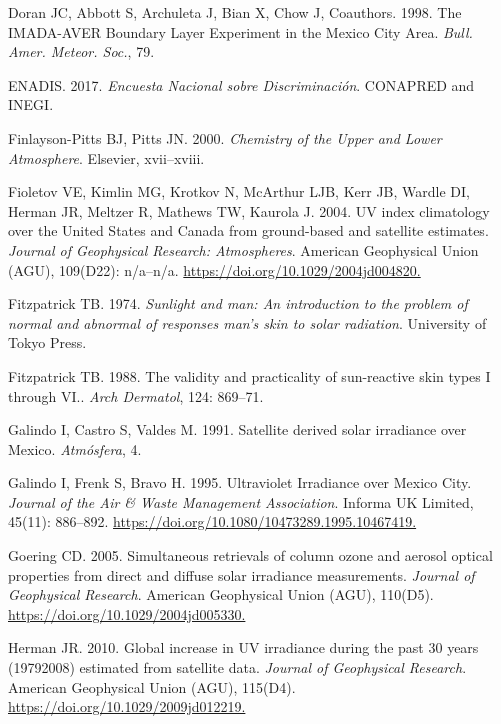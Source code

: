 \documentclass[10pt]{article}
\begin{document}
\label{csl:2}Doran JC, Abbott S, Archuleta J, Bian X, Chow J, Coauthors. 1998. {The IMADA-AVER Boundary Layer Experiment in the Mexico City Area}. \textit{Bull. Amer. Meteor. Soc.}, 79.

\label{csl:50}ENADIS. 2017. \textit{{Encuesta Nacional sobre Discriminación}}. CONAPRED and INEGI.

\label{csl:11}Finlayson-Pitts BJ, Pitts JN. 2000. \textit{{Chemistry of the Upper and Lower Atmosphere}}. Elsevier, xvii--xviii.

\label{csl:56}Fioletov VE, Kimlin MG, Krotkov N, McArthur LJB, Kerr JB, Wardle DI, Herman JR, Meltzer R, Mathews TW, Kaurola J. 2004. {{UV} index climatology over the United States and Canada from ground-based and satellite estimates}. \textit{Journal of Geophysical Research: Atmospheres}. American Geophysical Union ({AGU}), 109(D22): n/a--n/a. \url{https://doi.org/10.1029/2004jd004820.}

\label{csl:22}Fitzpatrick TB. 1974. \textit{{Sunlight and man: An introduction to the problem of normal and abnormal of responses man's skin to solar radiation}}. University of Tokyo Press.

\label{csl:30}Fitzpatrick TB. 1988. {The validity and practicality of sun-reactive skin types I through VI.}. \textit{Arch Dermatol}, 124: 869–71.

\label{csl:15}Galindo I, Castro S, Valdes M. 1991. {Satellite derived solar irradiance over Mexico}. \textit{Atmósfera}, 4.

\label{csl:19}Galindo I, Frenk S, Bravo H. 1995. {Ultraviolet Irradiance over Mexico City}. \textit{Journal of the Air {\&} Waste Management Association}. Informa {UK} Limited, 45(11): 886–892. \url{https://doi.org/10.1080/10473289.1995.10467419.}

\label{csl:20}Goering CD. 2005. {Simultaneous retrievals of column ozone and aerosol optical properties from direct and diffuse solar irradiance measurements}. \textit{Journal of Geophysical Research}. American Geophysical Union ({AGU}), 110(D5). \url{https://doi.org/10.1029/2004jd005330.}

\label{csl:28}Herman JR. 2010. {Global increase in {UV} irradiance during the past 30 years (1979{\textendash}2008) estimated from satellite data}. \textit{Journal of Geophysical Research}. American Geophysical Union ({AGU}), 115(D4). \url{https://doi.org/10.1029/2009jd012219.}
\end{document}
